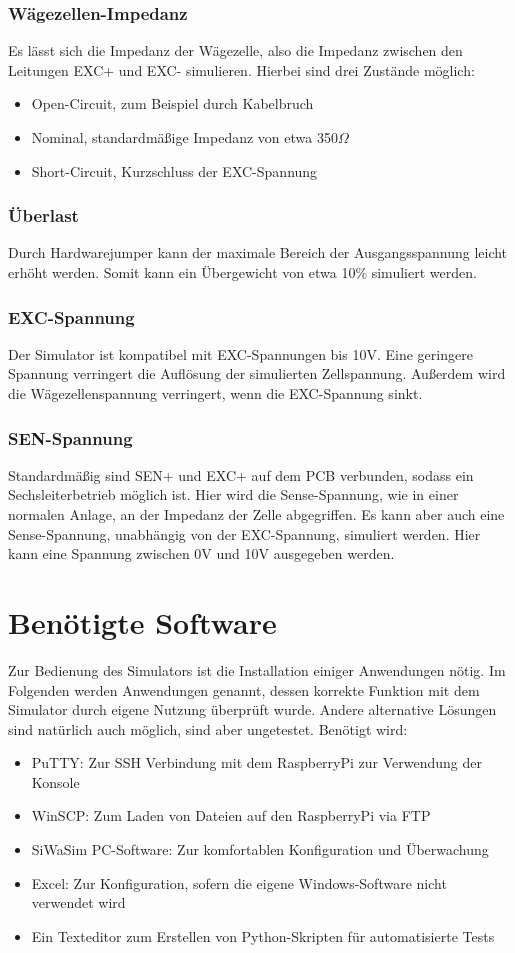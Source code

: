 \documentclass[12pt, a4paper]{report}
\begin{document}
\subsection{Wägezellen-Impedanz}
Es lässt sich die Impedanz der Wägezelle, also die Impedanz zwischen den Leitungen EXC+ und EXC- simulieren. Hierbei sind drei Zustände möglich:
\begin{itemize}
\item Open-Circuit, zum Beispiel durch Kabelbruch
\item Nominal, standardmäßige Impedanz von etwa 350$\Omega$
\item Short-Circuit, Kurzschluss der EXC-Spannung
\end{itemize}
\subsection{Überlast}
Durch Hardwarejumper kann der maximale Bereich der Ausgangsspannung leicht erhöht werden. Somit kann ein Übergewicht von etwa 10\% simuliert werden.
\subsection{EXC-Spannung}
Der Simulator ist kompatibel mit EXC-Spannungen bis 10V. Eine geringere Spannung verringert die Auflösung der simulierten Zellspannung. Außerdem wird die Wägezellenspannung verringert, wenn die EXC-Spannung sinkt. 
\subsection{SEN-Spannung}
Standardmäßig sind SEN+ und EXC+ auf dem PCB verbunden, sodass ein Sechsleiterbetrieb möglich ist. Hier wird die Sense-Spannung, wie in einer normalen Anlage, an der Impedanz der Zelle abgegriffen. Es kann aber auch eine Sense-Spannung, unabhängig von der EXC-Spannung, simuliert werden. Hier kann eine Spannung zwischen 0V und 10V ausgegeben werden.
\chapter{Benötigte Software}
Zur Bedienung des Simulators ist die Installation einiger Anwendungen nötig. Im Folgenden werden Anwendungen genannt, dessen korrekte Funktion mit dem Simulator durch eigene Nutzung überprüft wurde. Andere alternative Lösungen sind natürlich auch möglich, sind aber ungetestet. Benötigt wird:
\begin{itemize}
\item PuTTY: Zur SSH Verbindung mit dem RaspberryPi zur Verwendung der Konsole
\item WinSCP: Zum Laden von Dateien auf den RaspberryPi via FTP
\item SiWaSim PC-Software: Zur komfortablen Konfiguration und Überwachung
\item Excel: Zur Konfiguration, sofern die eigene Windows-Software nicht verwendet wird
\item Ein Texteditor zum Erstellen von Python-Skripten für automatisierte Tests
\end{itemize}
\end{document}
